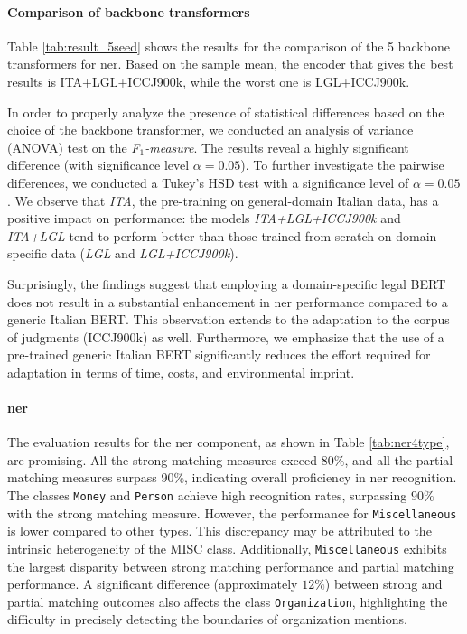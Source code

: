 \paragraph{Comparison of backbone transformers}
Table \ref{tab:result_5seed} shows the results for the comparison of the 5 backbone transformers for \ac{ner}.
Based on the sample mean, the encoder that gives the best results is ITA+LGL+ICCJ900k, while the worst one is LGL+ICCJ900k.

In order to properly analyze the presence of statistical differences based on the choice of the backbone transformer, we conducted an analysis of variance (ANOVA) test on the \textit{F$_1$-measure}. The results reveal a highly significant difference (with significance level $\alpha=0.05$). To further investigate the pairwise differences, we conducted a Tukey's HSD test with a significance level of $\alpha=0.05$. We observe that \textit{ITA}, the pre-training on general-domain Italian data, has a positive impact on performance: the models \textit{ITA+LGL+ICCJ900k} and \textit{ITA+LGL} tend to perform better than those trained from scratch on domain-specific data (\textit{LGL} and \textit{LGL+ICCJ900k}).

Surprisingly, the findings suggest that employing a domain-specific legal BERT does not result in a substantial enhancement in \ac{ner} performance compared to a generic Italian BERT. This observation extends to the adaptation to the corpus of judgments (ICCJ900k) as well. Furthermore, we emphasize that the use of a pre-trained generic Italian BERT significantly reduces the effort required for adaptation in terms of time, costs, and environmental imprint.



\paragraph{\ac{ner}}

The evaluation results for the \ac{ner} component, as shown in Table \ref{tab:ner4type}, are promising. All the strong matching measures exceed $80\%$, and all the partial matching measures surpass $90\%$, indicating overall proficiency in \ac{ner} recognition. The classes \texttt{Money} and \texttt{Person} achieve high recognition rates, surpassing $90\%$ with the strong matching measure. However, the performance for \texttt{Miscellaneous} is lower compared to other types. This discrepancy may be attributed to the intrinsic heterogeneity of the MISC class. Additionally, \texttt{Miscellaneous} exhibits the largest disparity between strong matching performance and partial matching performance. A significant difference (approximately $12\%$) between strong and partial matching outcomes also affects the class \texttt{Organization}, highlighting the difficulty in precisely detecting the boundaries of organization mentions.

